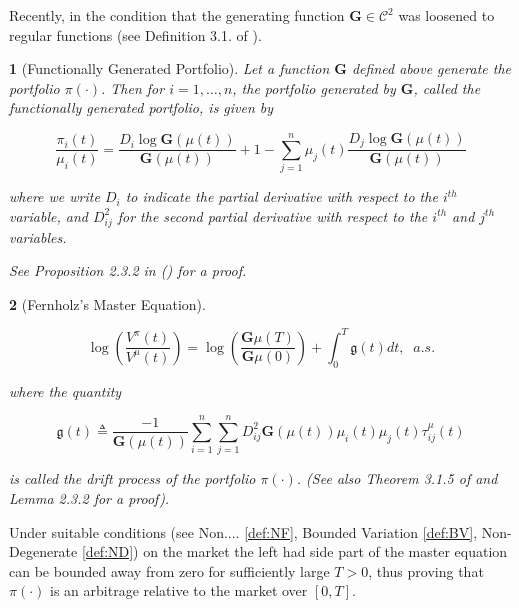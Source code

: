\documentclass[british]{amsart}
\numberwithin{equation}{section}
\numberwithin{figure}{section}
\theoremstyle{plain}
\newtheorem{thm}{\protect\theoremname}[section]
\theoremstyle{definition}
\theoremstyle{plain}
\theoremstyle{plain}
\theoremstyle{plain}
\newtheorem{prop}[thm]{\protect\propositionname}
\theoremstyle{remark}
\theoremstyle{plain}
\providecommand{\propositionname}{Proposition}
\providecommand{\theoremname}{Theorem}
\begin{document}
Recently, in \cite{karatzas2017} the condition that the generating function $\mathbf{G}\in\mathcal{C}^{2}$ was loosened to regular functions (see Definition 3.1. of \cite{karatzas2017}).

\begin{prop} [Functionally Generated Portfolio]
	\label{prop:FGP}
	Let a function $\mathbf{G}$ defined above generate the portfolio $\pi(\cdot)$. Then for $i=1,\dots,n$, the portfolio generated by $\mathbf{G}$, called the functionally generated portfolio, is given by

	\begin{equation}
		\frac{\pi_{i}(t)}{\mu_{i}(t)} = 
			\frac{D_{i}\log\mathbf{G}(\mu(t))}{\mathbf{G}(\mu(t))}+1 - 
			\sum_{j=1}^{n} \mu_{j}(t) \frac{D_{j} \log \mathbf{G}(\mu(t))}{\mathbf{G}(\mu(t))}
	\end{equation}

where we write $D_{i}$ to indicate the partial derivative with respect to the $i^{th}$ variable, and $D_{ij}^{2}$ for the second partial derivative with respect to the $i^{th}$ and $j^{th}$ variables. 

	See Proposition 2.3.2 in (\cite{vervuurt2015}) for a proof.
\end{prop}

\begin{thm} [Fernholz's Master Equation]
	\label{thm:masterequation}

	\begin{equation}
		\log\left(\frac{V^{\pi}(t)}{V^{\mu}(t)}\right)=\log\left(\frac{\mathbf{G}\mu(T)}{\mathbf{G}\mu(0)}\right)+\int_{0}^{T}\mathfrak{g}(t)dt,\;\;a.s.
	\end{equation}

where the quantity

	\begin{equation}
		\mathfrak{g}(t)\triangleq\frac{-1}{\mathbf{G}(\mu(t))}\sum_{i=1}^{n}\sum_{j=1}^{n}D_{ij}^{2}\mathbf{G}(\mu(t))\mu_{i}(t)\mu_{j}(t)\tau_{ij}^{\mu}(t)
	\end{equation}

is called the \textit{drift process} of the portfolio $\pi(\cdot)$. (See also Theorem 3.1.5 of \cite{fernholz2002} and Lemma 2.3.2 for a proof).

\end{thm}

Under suitable conditions (see Non.... \ref{def:NF}, Bounded Variation \ref{def:BV}, Non-Degenerate \ref{def:ND}) on the market the left had side part of the master equation can be bounded away from zero
for sufficiently large $T>0$, thus proving that $\pi(\cdot)$ is an arbitrage relative to the market over $[0,T]$.
\end{document}
